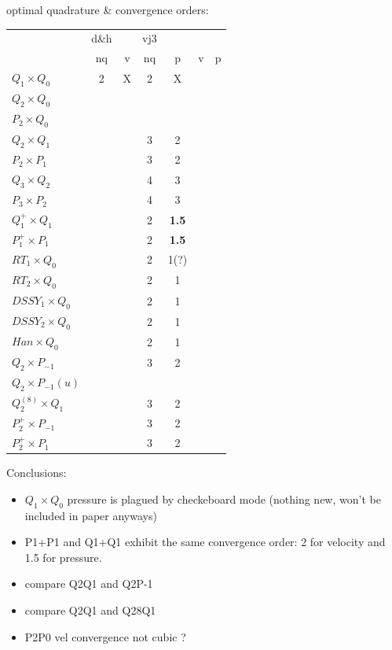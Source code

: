 \newpage
optimal quadrature \& convergence orders:

\begin{center}
\begin{tabular}{l|ccc|ccc|}
\hline
                     & d\&h &   & vj3 & \\
                     & nq &v    & nq & p & v & p \\
\hline
\hline
$Q_1\times Q_0$       & 2    & X & 2 & X  \\%
$Q_2\times Q_0$       &     &  &  &       \\%
$P_2\times Q_0$       &     &  &  &       \\%
$Q_2\times Q_1$       &      &   & 3 & 2  \\%
$P_2\times P_1$       &      &   & 3 & 2  \\%
$Q_3\times Q_2$       &      &   & 4 & 3  \\%
$P_3\times P_2$       &      &   & 4 & 3  \\%
$Q_1^+\times Q_1$     &      &   & 2 & {\bf 1.5}  \\%
$P_1^+\times P_{1}$   &      &   & 2 & {\bf 1.5}  \\%
$RT_1\times Q_0$      &      &   & 2 & 1(?)\\%
$RT_2\times Q_0$      &      &   & 2 & 1   \\%
$DSSY_1\times Q_0$    &      &   & 2 & 1   \\%
$DSSY_2\times Q_0$    &      &   & 2 & 1   \\%
$Han\times Q_0$       &      &   & 2 & 1   \\%
$Q_2\times P_{-1}$    &      &   & 3 & 2   \\%
$Q_2\times P_{-1}(u)$ &      &   &  &      \\%
$Q_2^{(8)}\times Q_1$ &      &   & 3 & 2   \\%
$P_2^+\times P_{-1}$  &      &   & 3 & 2   \\%
$P_2^+\times P_{1}$   &      &   & 3 & 2   \\%
\hline
\end{tabular} 
\end{center}

\vspace{1cm}

Conclusions:
\begin{itemize}
\item $Q_1\times Q_0$ pressure is plagued by checkeboard mode (nothing new, won't be included in paper anyways)
\item P1+P1 and Q1+Q1 exhibit the same convergence order: 2 for velocity and 1.5 for pressure.
\item compare Q2Q1 and Q2P-1
\item compare Q2Q1 and Q28Q1
\item P2P0 vel convergence not cubic ?
\end{itemize}






